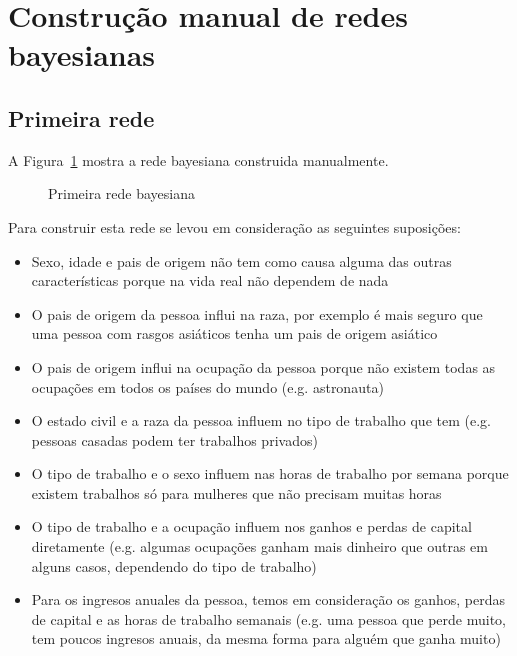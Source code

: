 \section{Construção manual de redes bayesianas}

\subsection{Primeira rede}
	A Figura~\ref{fig:rede1} mostra a rede bayesiana construida manualmente.
	\begin{figure}[H]
		\centering
		
		\caption{Primeira rede bayesiana}
		\label{fig:rede1}
	\end{figure}
	Para construir esta rede se levou em consideração as seguintes suposições:
	\begin{itemize}
		\item Sexo, idade e pais de origem não tem como causa alguma das outras características porque na vida real não dependem de nada
		\item O pais de origem da pessoa influi na raza, por exemplo é mais seguro que uma pessoa com rasgos asiáticos tenha um pais de origem asiático
		\item O pais de origem influi na ocupação da pessoa porque não existem todas as ocupações em todos os países do mundo (e.g. astronauta)
		\item O estado civil e a raza da pessoa influem no tipo de trabalho que tem (e.g. pessoas casadas podem ter trabalhos privados)
		\item O tipo de trabalho e o sexo influem nas horas de trabalho por semana porque existem trabalhos só para mulheres que não precisam muitas horas
		\item O tipo de trabalho e a ocupação influem nos ganhos e perdas de capital diretamente (e.g. algumas ocupações ganham mais dinheiro que outras em alguns casos, dependendo do tipo de trabalho)
		\item Para os ingresos anuales da pessoa, temos em consideração os ganhos, perdas de capital e as horas de trabalho semanais (e.g. uma pessoa que perde muito, tem poucos ingresos anuais, da mesma forma para alguém que ganha muito)
	\end{itemize}
	
